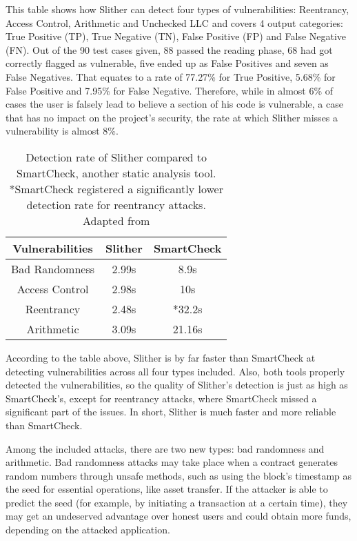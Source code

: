 This table shows how Slither can detect four types of vulnerabilities: Reentrancy, Access Control, Arithmetic and Unchecked LLC and covers 4 output categories: True Positive (TP), True Negative (TN), False Positive (FP) and False Negative (FN). Out of the 90 test cases given, 88 passed the reading phase, 68 had got correctly flagged as vulnerable, five ended up as False Positives and seven as False Negatives. That equates to a rate of 77.27\% for True Positive, 5.68\% for False Positive and 7.95\% for False Negative. Therefore, while in almost 6\% of cases the user is falsely lead to believe a section of his code is vulnerable, a case that has no impact on the project's security, the rate at which Slither misses a vulnerability is almost 8\%. 

\begin{table}[h]
\centering
\begin{tabular}{|c|cc|}
\hline
Vulnerabilities & Slither & SmartCheck \\ \hline
Bad Randomness  & 2.99s   & 8.9s       \\
Access Control  & 2.98s   & 10s        \\
Reentrancy      & 2.48s   & *32.2s     \\
Arithmetic      & 3.09s   & 21.16s     \\ \hline
\end{tabular}
\caption{Detection rate of Slither compared to SmartCheck, another static analysis tool. *SmartCheck registered a significantly lower detection rate for reentrancy attacks. Adapted from \cite{slitherVSsmartCheck}}
\label{tab:my-table}
\end{table}

According to the table above, Slither is by far faster than SmartCheck at detecting vulnerabilities across all four types included. Also, both tools properly detected the vulnerabilities, so the quality of Slither's detection is just as high as SmartCheck's, except for reentrancy attacks, where SmartCheck missed a significant part of the issues. In short, Slither is much faster and more reliable than SmartCheck.

Among the included attacks, there are two new types: bad randomness and arithmetic. Bad randomness \cite{badRandomness} attacks may take place when a contract generates random numbers through unsafe methods, such as using the block's timestamp as the seed for essential operations, like asset transfer. If the attacker is able to predict the seed (for example, by initiating a transaction at a certain time), they may get an undeserved advantage over honest users and could obtain more funds, depending on the attacked application.

